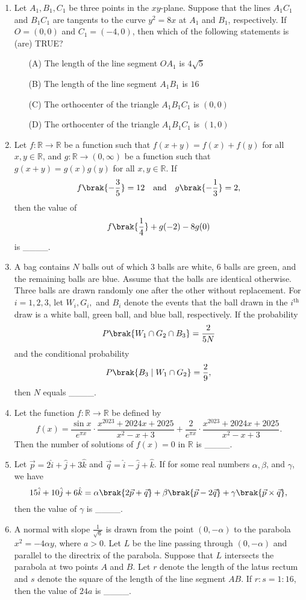 \documentclass[12pt,a4paper]{article}
\begin{document}
\begin{enumerate}
\item Let $A_1, B_1, C_1$ be three points in the $xy$-plane. Suppose that the lines $A_1C_1$ and $B_1C_1$ are tangents to the curve $y^2 = 8x$ at $A_1$ and $B_1$, respectively. If $O = (0,0)$ and $C_1 = (-4,0)$, then which of the following statements is (are) TRUE?

\begin{itemize}
    \item[(A)] The length of the line segment $OA_1$ is $4\sqrt{5}$
    \item[(B)] The length of the line segment $A_1B_1$ is $16$
    \item[(C)] The orthocenter of the triangle $A_1B_1C_1$ is $(0,0)$
    \item[(D)] The orthocenter of the triangle $A_1B_1C_1$ is $(1,0)$
\end{itemize}
\item Let $f : \mathbb{R} \to \mathbb{R}$ be a function such that $f(x+y) = f(x) + f(y)$ for all $x, y \in \mathbb{R}$, and $g : \mathbb{R} \to (0, \infty)$ be a function such that $g(x+y) = g(x) g(y)$ for all $x, y \in \mathbb{R}$. If 
\[
f\brak{-\frac{3}{5}} = 12 \quad \text{and} \quad g\brak{-\frac{1}{3}} = 2,
\]
then the value of 
\[
f\brak{\frac{1}{4}} + g(-2) - 8 g(0)
\]
is \_\_\_\_.

\item A bag contains $N$ balls out of which $3$ balls are white, $6$ balls are green, and the remaining balls are blue. Assume that the balls are identical otherwise. Three balls are drawn randomly one after the other without replacement. For $i = 1,2,3$, let $W_i, G_i,$ and $B_i$ denote the events that the ball drawn in the $i^{\text{th}}$ draw is a white ball, green ball, and blue ball, respectively. If the probability 
\[
P\brak{W_1 \cap G_2 \cap B_3} = \frac{2}{5N}
\]
and the conditional probability 
\[
P\brak{B_3 \mid W_1 \cap G_2} = \frac{2}{9},
\]
then $N$ equals \_\_\_\_.
\item Let the function $f : \mathbb{R} \to \mathbb{R}$ be defined by
\[
f(x) = \frac{\sin x}{e^{\pi x}} \cdot \frac{x^{2023} + 2024x + 2025}{x^2 - x + 3} + \frac{2}{e^{\pi x}} \cdot \frac{x^{2023} + 2024x + 2025}{x^2 - x + 3}.
\]
Then the number of solutions of $f(x) = 0$ in $\mathbb{R}$ is \_\_\_\_.

\item Let $\vec{p} = 2\hat{i} + \hat{j} + 3\hat{k}$ and $\vec{q} = \hat{i} - \hat{j} + \hat{k}$. If for some real numbers $\alpha, \beta$, and $\gamma$, we have
\[
15\hat{i} + 10\hat{j} + 6\hat{k} = \alpha \brak{2\vec{p} + \vec{q}} + \beta \brak{\vec{p} - 2\vec{q}} + \gamma \brak{\vec{p} \times \vec{q}},
\]
then the value of $\gamma$ is \_\_\_\_.
\item A normal with slope $ \frac{1}{\sqrt{6}} $ is drawn from the point $ (0,-\alpha) $ to the parabola $ x^2 = -4\alpha y $, where $ a > 0 $. Let $ L $ be the line passing through $ (0,-\alpha) $ and parallel to the directrix of the parabola. Suppose that $ L $ intersects the parabola at two points $ A $ and $ B $. Let $ r $ denote the length of the latus rectum and $ s $ denote the square of the length of the line segment $ AB $. If $ r:s = 1:16 $, then the value of $ 24a $ is \_\_\_\_.


\end{enumerate}
\end{document}
